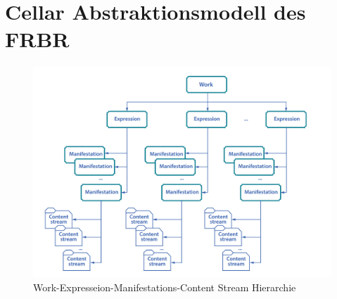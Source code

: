     \section{Cellar Abstraktionsmodell des FRBR}

    \begin{figure}
        \centering
        \includegraphics[width=0.75\linewidth]{gfx/content_modell.png}
        \caption{Work-Expresseion-Manifestations-Content Stream Hierarchie}
        \label{fig:eu_wemi}
    \end{figure}